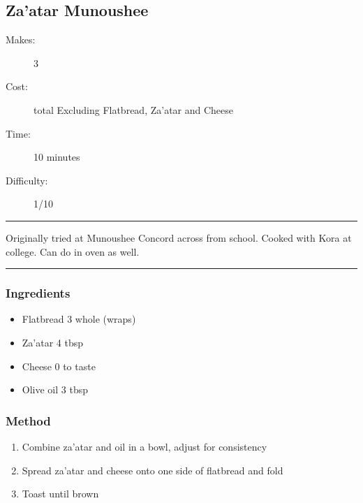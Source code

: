 \documentclass[]{article}
\begin{document}
\subsection*{\center\huge Za'atar Munoushee}
\begin{description}
\item[Makes:] 3 
\item[Cost:]  total Excluding Flatbread, Za'atar and Cheese
\item[Time:] 10 minutes
\item[Difficulty:] 1/10
\end{description}
\vspace{0.2cm}\hrule\vspace{0.5cm}
\begin{adjustwidth}{0.5 cm}{0.5 cm}

Originally tried at Munoushee Concord across from school. Cooked with Kora at college. Can do in oven as well. \hfill{}\color{black}

\end{adjustwidth}
\vspace{0.5cm}\hrule
\subsubsection*{\Large Ingredients}
\begin{multicols}{2}
\begin{itemize}
 \item Flatbread \hfill 3 whole (wraps)
 \item Za'atar \hfill 4 tbsp
 \item Cheese \hfill 0 to taste
 \item Olive oil \hfill 3 tbsp
\end{itemize}
\end{multicols}
\subsubsection*{\Large Method}
\begin{enumerate}[font=\huge\color{accent}]
	\item Combine za'atar and oil in a bowl, adjust for consistency
	\item Spread za'atar and cheese onto one side of flatbread and fold
	\item Toast until brown
\end{enumerate}
\newpage
{}
\end{document}
